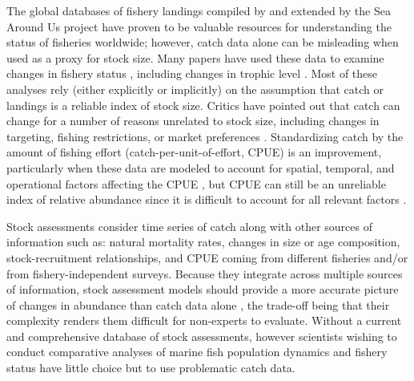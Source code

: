 The global databases of fishery landings compiled by
\cite{FAO:fishstat} and extended by the Sea Around Us project
\citep{Watson:etal:2004:fandf} have proven to be valuable resources
for understanding the status of fisheries worldwide; however, catch
data alone can be misleading when used as a proxy for stock size.
Many papers have used these data to examine changes in fishery status
\citep{Worm:etal:2006:science, Costello:etal:2008:science}, including
changes in trophic level \citep{Pauly:etal:1998,
  Essington:etal:2006:procnatacadsci, Newton:etal:2007:currentbiol}.
Most of these analyses rely (either explicitly or implicitly) on the
assumption that catch or landings is a reliable index of stock size.
Critics have pointed out that catch can change for a number of reasons
unrelated to stock size, including changes in targeting, fishing
restrictions, or market preferences \citep{deMutsert:etal:2008:pnas,
 Murawski:Methot:Tromble:2007:science, Hilborn:2007:science,
 Caddy:etal:1998:science}. Standardizing catch by the amount of
fishing effort (catch-per-unit-of-effort, CPUE) is an improvement,
particularly when these data are modeled to account for spatial,
temporal, and operational factors affecting the CPUE
\citep{Maunder:punt:2004:fishres}, but CPUE can still be an unreliable
index of relative abundance since it is difficult to account for all
relevant factors \citep{Hutchings:Myers:1994:cjfas,
 Harley:etal:2001:cjfas, Walters:2003:cjfas, Polacheck:2006:marpol}.

Stock assessments consider time series of catch along with other
sources of information such as: natural mortality rates, changes in
size or age composition, stock-recruitment relationships, and CPUE
coming from different fisheries and/or from fishery-independent surveys.
Because they integrate across multiple sources of information, stock
assessment models should provide a more accurate picture of
changes in abundance than catch data alone
\citep{Sibert:etal:2006:science}, the trade-off being that their complexity
renders them difficult for non-experts to evaluate. Without a current and
comprehensive database of stock assessments, however scientists wishing to
conduct comparative analyses of marine fish population dynamics and
fishery status have little choice but to use problematic catch data.

